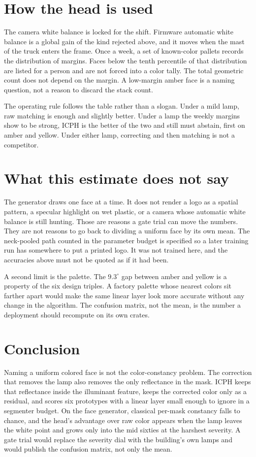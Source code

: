 \documentclass[10pt]{article}
\begin{document}
\section{How the head is used}
The camera white balance is locked for the shift. Firmware automatic white balance is a global gain of the kind rejected above, and it moves when the mast of the truck enters the frame. Once a week, a set of known-color pallets records the distribution of margins. Faces below the tenth percentile of that distribution are listed for a person and are not forced into a color tally. The total geometric count does not depend on the margin. A low-margin amber face is a naming question, not a reason to discard the stack count.

The operating rule follows the table rather than a slogan. Under a mild lamp, raw matching is enough and slightly better. Under a lamp the weekly margins show to be strong, ICPH is the better of the two and still must abstain, first on amber and yellow. Under either lamp, correcting and then matching is not a competitor.

\section{What this estimate does not say}
The generator draws one face at a time. It does not render a logo as a spatial pattern, a specular highlight on wet plastic, or a camera whose automatic white balance is still hunting. Those are reasons a gate trial can move the numbers. They are not reasons to go back to dividing a uniform face by its own mean. The neck-pooled path counted in the parameter budget is specified so a later training run has somewhere to put a printed logo. It was not trained here, and the accuracies above must not be quoted as if it had been.

A second limit is the palette. The $9.3^{\circ}$ gap between amber and yellow is a property of the six design triples. A factory palette whose nearest colors sit farther apart would make the same linear layer look more accurate without any change in the algorithm. The confusion matrix, not the mean, is the number a deployment should recompute on its own crates.

\section{Conclusion}
Naming a uniform colored face is not the color-constancy problem. The correction that removes the lamp also removes the only reflectance in the mask. ICPH keeps that reflectance inside the illuminant feature, keeps the corrected color only as a residual, and scores six prototypes with a linear layer small enough to ignore in a segmenter budget. On the face generator, classical per-mask constancy falls to chance, and the head's advantage over raw color appears when the lamp leaves the white point and grows only into the mid sixties at the harshest severity. A gate trial would replace the severity dial with the building's own lamps and would publish the confusion matrix, not only the mean.
\end{document}
